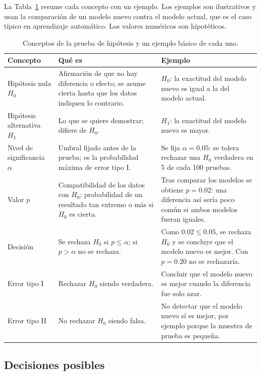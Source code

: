 \documentclass[11pt,letterpaper]{article}
\begin{document}
La Tabla~\ref{tab:conceptos} resume cada concepto con un ejemplo. Los ejemplos son ilustrativos y usan la comparación de un modelo nuevo contra el modelo actual, que es el caso típico en aprendizaje automático. Los valores numéricos son hipotéticos.

\begin{table}[htbp]
\centering
\caption{Conceptos de la prueba de hipótesis y un ejemplo básico de cada uno.}
\label{tab:conceptos}
\small
\renewcommand{\arraystretch}{1.4}
\begin{tabular}{p{2.8cm}p{5.2cm}p{7.2cm}}
\hline
\textbf{Concepto} & \textbf{Qué es} & \textbf{Ejemplo} \\
\hline
Hipótesis nula $H_0$ & Afirmación de que no hay diferencia o efecto; se asume cierta hasta que los datos indiquen lo contrario. & $H_0$: la exactitud del modelo nuevo es igual a la del modelo actual. \\
Hipótesis alternativa $H_1$ & Lo que se quiere demostrar; difiere de $H_0$. & $H_1$: la exactitud del modelo nuevo es mayor. \\
Nivel de significancia $\alpha$ & Umbral fijado antes de la prueba; es la probabilidad máxima de error tipo I. & Se fija $\alpha = 0.05$: se tolera rechazar una $H_0$ verdadera en 5 de cada 100 pruebas. \\
Valor $p$ & Compatibilidad de los datos con $H_0$; probabilidad de un resultado tan extremo o más si $H_0$ es cierta. & Tras comparar los modelos se obtiene $p = 0.02$: una diferencia así sería poco común si ambos modelos fueran iguales. \\
Decisión & Se rechaza $H_0$ si $p \le \alpha$; si $p > \alpha$ no se rechaza. & Como $0.02 \le 0.05$, se rechaza $H_0$ y se concluye que el modelo nuevo es mejor. Con $p = 0.20$ no se rechazaría. \\
Error tipo I & Rechazar $H_0$ siendo verdadera. & Concluir que el modelo nuevo es mejor cuando la diferencia fue solo azar. \\
Error tipo II & No rechazar $H_0$ siendo falsa. & No detectar que el modelo nuevo sí es mejor, por ejemplo porque la muestra de prueba es pequeña. \\
\hline
\end{tabular}
\end{table}

\subsection{Decisiones posibles}
\end{document}
